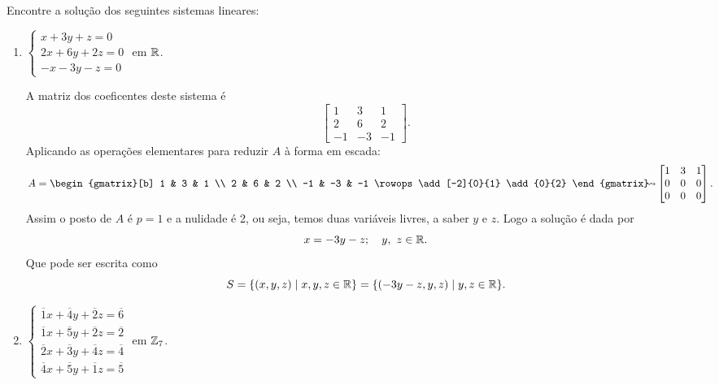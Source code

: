 \begin{exemplo}
	Encontre a solu\c{c}\~ao dos seguintes sistemas lineares:
	\begin{enumerate}
		\item $\begin{cases}
			x + 3y + z = 0\\
			2x + 6y + 2z = 0\\
			-x - 3y - z = 0
		\end{cases}$ em $\mathbb{R}$.
		\begin{solucao}
			A matriz dos coeficentes deste sistema \'e
			\[
				\begin{bmatrix}
					1 & 3 & 1\\
					2 & 6 & 2\\
					-1 & -3 & -1
				\end{bmatrix}.
			\]
			Aplicando as opera\c{c}\~oes elementares para reduzir $A$ \`a forma em escada:
			\begin{align*}
				A = \begin{gmatrix}[b]
  						1 & 3 & 1 \\
   						2 & 6 & 2 \\
   						-1 & -3 & -1 
  						\rowops
					    \add[-2]{0}{1}
   						\add{0}{2}
     				\end{gmatrix}\kern-6.23pt\leadsto&\begin{bmatrix}
  						1 & 3 & 1 \\
   						0 & 0 & 0 \\
   						0 & 0 & 0 
     				\end{bmatrix}.
			\end{align*}
			Assim o posto de $A$ \'e $p = 1$ e a nulidade \'e 2, ou seja, temos duas vari\'aveis livres, a saber $y$ e $z$. Logo a solu\c{c}\~ao \'e dada por
			\[
				x = -3y - z;\quad y,\ z \in \mathbb{R}.
			\]
			Que pode ser escrita como
			\[
				S = \{(x, y ,z) \mid x, y, z \in \mathbb{R} \} = \{(-3y - z, y, z) \mid y, z \in \mathbb{R}\}.
			\]
		\end{solucao}
		\item $\begin{cases}
			\overline{1}x + \overline{4}y + \overline{2}z = \overline{6}\\
			\overline{1}x + \overline{5}y + \overline{2}z = \overline{2}\\
			\overline{2}x + \overline{3}y + \overline{4}z = \overline{4}\\
			\overline{4}x + \overline{5}y + \overline{1}z = \overline{5}
		\end{cases}$ em $\mathbb{Z}_7$.

\end{enumerate}
\end{exemplo}
